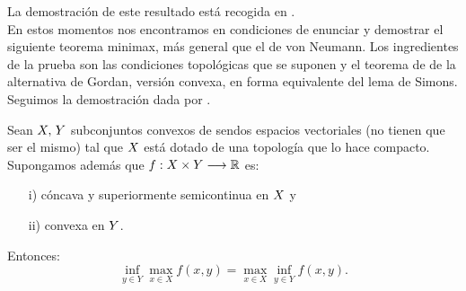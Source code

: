 La demostración de este resultado está recogida en \cite{borwein}. \\

En estos momentos nos encontramos en condiciones de enunciar y demostrar el siguiente teorema minimax, más general que el de von Neumann. Los ingredientes de la prueba son las condiciones topológicas que se suponen y el teorema de de la alternativa de Gordan, versión convexa, en forma equivalente del lema de Simons. Seguimos la demostración dada por \cite{Simons2008}.
\bigskip
\begin{teoremaBox}\label{MinMax}
Sean $ X,\hspace{0.5mm} Y $ subconjuntos convexos de sendos espacios vectoriales (no tienen que ser el mismo) tal que $ X $ está dotado de una topología que lo hace compacto. Supongamos además que $ f:  X \times Y \longrightarrow \mathbb{R} $ es:
\begin{itemize}	
\item[i)] cóncava y superiormente semicontinua en $ X $ y
\item[ii)] convexa en $ Y $.
\end{itemize}
Entonces:
\begin{equation*}\label{eqMinMax}
\inf_{y \in Y} \max_{x \in X} f(x,y) = \max_{x \in X} \inf_{y \in Y} f(x,y).
\end{equation*}
\end{teoremaBox}

